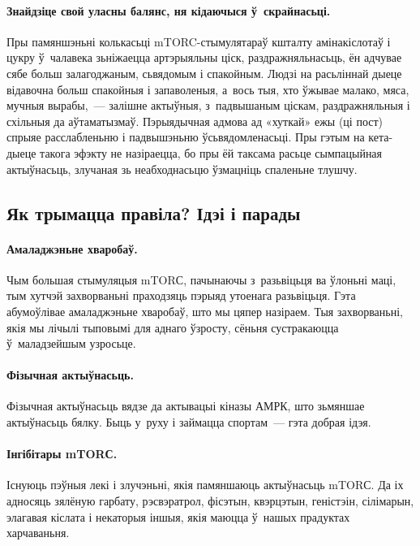 
\paragraph{Знайдзіце свой уласны балянс, ня кідаючыся ў~скрайнасьці.}
Пры памяншэньні колькасьці mTORC-стымулятараў кшталту амінакіслотаў і цукру ў~чалавека зьніжаецца артэрыяльны ціск, раздражняльнасьць, ён адчувае сябе больш залагоджаным, сьвядомым і спакойным. Людзі на расьліннай дыеце відавочна больш спакойныя і запаволеныя, а~вось тыя, хто ўжывае малако, мяса, мучныя вырабы,~--- залішне актыўныя, з~падвышаным ціскам, раздражняльныя і схільныя да аўтаматызмаў. Пэрыядычная адмова ад «хуткай» ежы (ці пост) спрыяе расслабленьню і падвышэньню ўсьвядомленасьці. Пры гэтым на кета-дыеце такога эфэкту не назіраецца, бо пры ёй таксама расьце сымпацыйная актыўнасьць, злучаная зь неабходнасьцю ўзмацніць спаленьне тлушчу.

\subsection{Як трымацца правіла? Ідэі і парады}

\paragraph{Амаладжэньне хваробаў.}
Чым большая стымуляцыя mTORС, пачынаючы з~разьвіцьця ва ўлоньні маці, тым хутчэй захворваньні праходзяць пэрыяд утоенага разьвіцьця. Гэта абумоўлівае амаладжэньне хваробаў, што мы цяпер назіраем. Тыя захворваньні, якія мы лічылі тыповымі для аднаго ўзросту, сёньня сустракаюцца ў~маладзейшым узросьце.

\paragraph{Фізычная актыўнасьць.}
Фізычная актыўнасьць вядзе да актывацыі кіназы АМРК, што зьмяншае актыўнасьць бялку. Быць у~руху і займацца спортам~--- гэта добрая ідэя.

\paragraph{Інгібітары mTORС.}
Існуюць пэўныя лекі і злучэньні, якія памяншаюць актыўнасьць mTORС. Да іх адносяць зялёную гарбату, рэсвэратрол, фісэтын, квэрцэтын, геністэін, сілімарын, элагавая кіслата і некаторыя іншыя, якія маюцца ў~нашых прадуктах харчаваньня.

